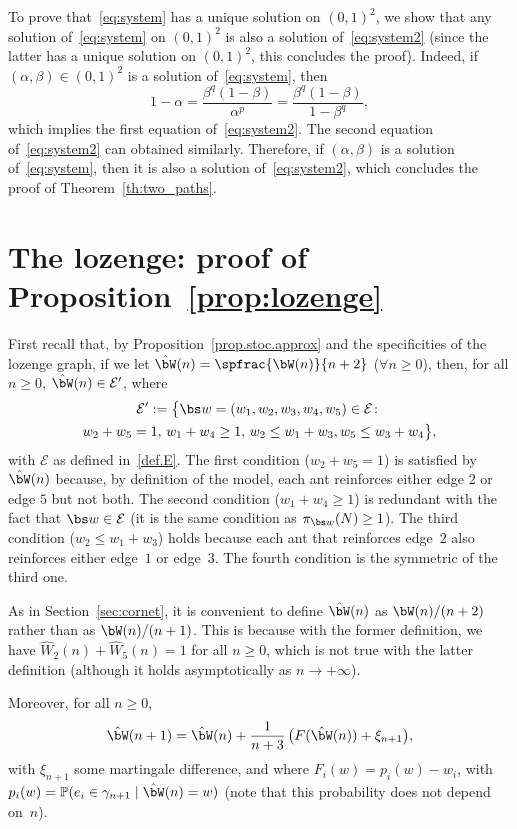 To prove that~\eqref{eq:system} has a unique solution on $(0,1)^2$, we show that any solution of~\eqref{eq:system} on $(0,1)^2$ is also a solution of~\eqref{eq:system2} (since the latter has a unique solution on $(0,1)^2$, this concludes the proof).
Indeed, if $(\alpha,\beta)\in (0,1)^2$ is a solution of~\eqref{eq:system}, then
\[
1-\alpha = \frac{\beta^q(1-\beta)}{\alpha^p} = \frac{\beta^q(1-\beta)}{1-\beta^q},
\]
which implies the first equation of~\eqref{eq:system2}. The second equation of~\eqref{eq:system2} can obtained similarly.
Therefore, if $(\alpha, \beta)$ is a solution of~\eqref{eq:system}, then it is also a solution of~\eqref{eq:system2}, which concludes the proof of Theorem~\ref{th:two_paths}.

\section{The lozenge: proof of Proposition~\ref{prop:lozenge}}
\label{sec:lozenge}
First recall that, by Proposition~\ref{prop.stoc.approx} and the specificities of the lozenge graph, if we let $\hat \bW(n) = \spfrac{\bW(n)}{n+2}$ ($\forall n\geq 0$),
then, for all $n\geq 0$, $\hat\bW(n)\in\mathcal E'$, where
\begin{multline*}
\mathcal E' :=
\bigl\{\bs w=(w_1, w_2, w_3, w_4, w_5)\in \mathcal E \colon\\
w_2 + w_5 = 1,\, w_1+w_4\geq 1,\, w_2 \leq w_1+w_3, w_5\leq w_3+w_4\bigr\},
\end{multline*}
with $\mathcal E$ as defined in~\eqref{def.E}.
The first condition ($w_2+w_5=1$) is satisfied by $\hat\bW(n)$ because, by definition of the model, each ant reinforces either edge $2$ or edge $5$ but not both. The second condition ($w_1+w_4\geq 1$)
is redundant with the fact that $\bs w \in \mathcal E$ (it is the same condition as $\pi_{\bs w}(N)\ge 1$). The third condition ($w_2 \leq w_1+w_3$) holds because each ant that reinforces edge~$2$ also reinforces either edge~$1$ or edge~$3$. The fourth condition is the symmetric of the third one.

{\begin{remark}
As in Section~\ref{sec:cornet},
it is convenient to define $\hat\bW(n)$ as $\bW(n)/(n+2)$ rather than as $\bW(n)/(n+1)$. This is because with the former definition, we have $\hat{W}_2(n) + \hat{W}_5(n) = 1$ for all $n\geq 0$, which is not true with the latter definition (although it holds asymptotically as $n\to+\infty$).
\end{remark}}

Moreover, for all $n\geq 0$,
\[
\hat \bW(n+1) =\hat \bW(n) + \frac1{n+3}\,\big(F(\hat\bW(n)) + \xi_{n+1}\big),
\]
with $\xi_{n+1}$ some martingale difference, and where
$F_i(w) = p_i(w) - w_i$, with $p_i(w) = \mathbb P(e_i\in \gamma_{n+1}\mid \hat\bW(n) = w)$ (note that this probability does not depend on~$n$).

